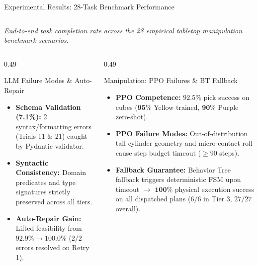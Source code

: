 \documentclass[10pt]{beamer}
\begin{document}
\begin{frame}{Experimental Results: 28-Task Benchmark Performance}
{\begin{tabular}{lccccc}
        \hline
    \end{tabular}%
    }
    \vspace{0.02cm}
    {\fontsize{5.2pt}{6.0pt}\selectfont \textit{End-to-end task completion rate across the 28 empirical tabletop manipulation benchmark scenarios.}}\par
    \vspace{0.04cm}
    \begin{columns}[T,totalwidth=\textwidth]
        \begin{column}{0.49\textwidth}
            \begin{block}{LLM Failure Modes \& Auto-Repair}
                \begin{itemize}\scriptsize
                    \item \textbf{Schema Validation (7.1\%):} 2 syntax/formatting errors (Trials 11 \& 21) caught by Pydantic validator.
                    \item \textbf{Syntactic Consistency:} Domain predicates and type signatures strictly preserved across all tiers.
                    \item \textbf{Auto-Repair Gain:} Lifted feasibility from $\mathbf{92.9\%} \to \mathbf{100.0\%}$ ($2/2$ errors resolved on Retry 1).
                \end{itemize}
            \end{block}
        \end{column}
        \begin{column}{0.49\textwidth}
            \begin{block}{Manipulation: PPO Failures \& BT Fallback}
                \begin{itemize}\scriptsize
                    \item \textbf{PPO Competence:} $\mathbf{92.5\%}$ pick success on cubes ($\mathbf{95\%}$ Yellow trained, $\mathbf{90\%}$ Purple zero-shot).
                    \item \textbf{PPO Failure Modes:} Out-of-distribution tall cylinder geometry and micro-contact roll cause step budget timeout ($\ge 90$ steps).
                    \item \textbf{Fallback Guarantee:} Behavior Tree fallback triggers deterministic FSM upon timeout $\to$ $\mathbf{100\%}$ physical execution success on all dispatched plans ($6/6$ in Tier 3, $27/27$ overall).
                \end{itemize}
            \end{block}
        \end{column}
    \end{columns}
\end{frame}
\end{document}
